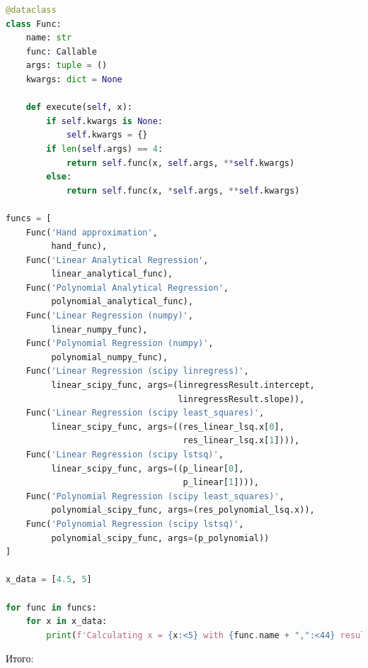 \documentclass[a4paper, 14pt]{extarticle}
\begin{document}
\begin{center}
    \begin{lstlisting}[language=Python]
@dataclass
class Func:
    name: str
    func: Callable
    args: tuple = ()
    kwargs: dict = None

    def execute(self, x):
        if self.kwargs is None:
            self.kwargs = {}
        if len(self.args) == 4:
            return self.func(x, self.args, **self.kwargs)
        else:
            return self.func(x, *self.args, **self.kwargs)

funcs = [
    Func('Hand approximation',                          
         hand_func),
    Func('Linear Analytical Regression',                
         linear_analytical_func),
    Func('Polynomial Analytical Regression',            
         polynomial_analytical_func),
    Func('Linear Regression (numpy)',                   
         linear_numpy_func),
    Func('Polynomial Regression (numpy)',               
         polynomial_numpy_func),
    Func('Linear Regression (scipy linregress)',        
         linear_scipy_func, args=(linregressResult.intercept, 
                                  linregressResult.slope)),
    Func('Linear Regression (scipy least_squares)',     
         linear_scipy_func, args=((res_linear_lsq.x[0],
                                   res_linear_lsq.x[1]))),
    Func('Linear Regression (scipy lstsq)',             
         linear_scipy_func, args=((p_linear[0],
                                   p_linear[1]))),
    Func('Polynomial Regression (scipy least_squares)', 
         polynomial_scipy_func, args=(res_polynomial_lsq.x)), 
    Func('Polynomial Regression (scipy lstsq)',         
         polynomial_scipy_func, args=(p_polynomial))
]

x_data = [4.5, 5]

for func in funcs:
    for x in x_data:
        print(f'Calculating x = {x:<5} with {func.name + ",":<44} result: {func.execute(x)}')
    \end{lstlisting}
\end{center}

Итого:
\end{document}
